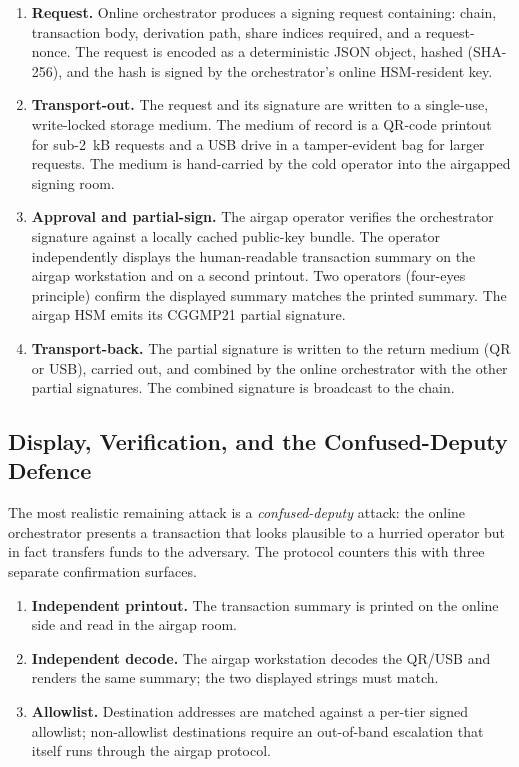 \begin{enumerate}[nosep]
\item \textbf{Request.} Online orchestrator produces a signing
request containing: chain, transaction body, derivation path, share
indices required, and a request-nonce. The request is encoded as a
deterministic JSON object, hashed (SHA-256), and the hash is signed
by the orchestrator's online HSM-resident key.
\item \textbf{Transport-out.} The request and its signature are
written to a single-use, write-locked storage medium. The medium of
record is a QR-code printout for sub-2~kB requests and a USB drive
in a tamper-evident bag for larger requests. The medium is hand-carried
by the cold operator into the airgapped signing room.
\item \textbf{Approval and partial-sign.} The airgap operator
verifies the orchestrator signature against a locally cached
public-key bundle. The operator independently displays the
human-readable transaction summary on the airgap workstation and
on a second printout. Two operators (four-eyes principle) confirm
the displayed summary matches the printed summary. The airgap
HSM emits its CGGMP21 partial signature.
\item \textbf{Transport-back.} The partial signature is written to
the return medium (QR or USB), carried out, and combined by the
online orchestrator with the other partial signatures. The combined
signature is broadcast to the chain.
\end{enumerate}

\subsection{Display, Verification, and the Confused-Deputy Defence}

The most realistic remaining attack is a \emph{confused-deputy}
attack: the online orchestrator presents a transaction that looks
plausible to a hurried operator but in fact transfers funds to the
adversary. The protocol counters this with three separate confirmation
surfaces.

\begin{enumerate}[nosep]
\item \textbf{Independent printout.} The transaction summary is
printed on the online side and read in the airgap room.
\item \textbf{Independent decode.} The airgap workstation decodes
the QR/USB and renders the same summary; the two displayed strings
must match.
\item \textbf{Allowlist.} Destination addresses are matched against
a per-tier signed allowlist; non-allowlist destinations require an
out-of-band escalation that itself runs through the airgap protocol.
\end{enumerate}

